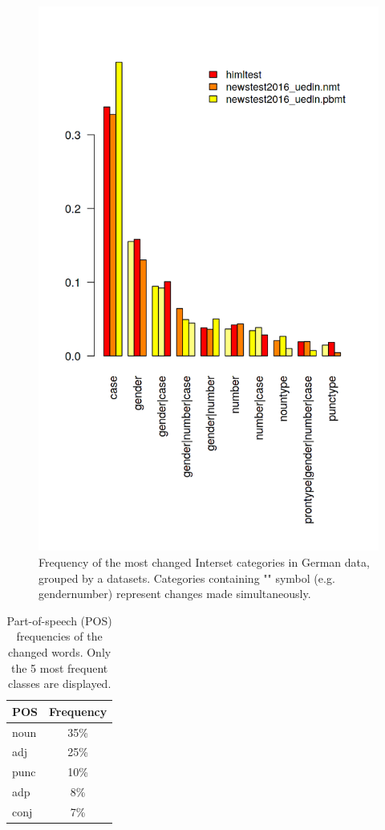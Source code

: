 \begin{figure}
\centering
  \includegraphics[scale=0.7]{iset_de}
  \caption{
    Frequency of the most changed Interset categories in German data, grouped by a datasets. Categories containing
    "\textbar" symbol (e.g. gender\textbar{}number) represent changes made simultaneously.
}
  \label{iset_de-barplot}
\end{figure}

\begin{table}[t]
\centering
\small

\begin{tabular}{lc}
POS  &  Frequency  \\
\hline
noun    &   35\%  \\
adj     &   25\%  \\
punc	&	10\%  \\
adp     &   8\%  \\
conj    &   7\%  \\
\end{tabular}
\caption{
    Part-of-speech (POS) frequencies of the changed words. Only the 5 most
	frequent classes are displayed.
}
\label{changes_de-pos}
\end{table}


